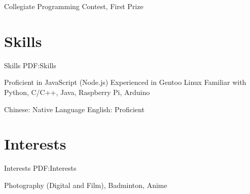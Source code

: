 \documentclass[a4paper,MMMyyyy,nonstop]{simpleresumecv}
\begin{document}
\begin{body}
\BulletItem
Collegiate Programming Contest, First Prize
\hfill
\textbf{  }


\section
{Skills}
{Skills}
{PDF:Skills}

\BulletItem
Proficient in JavaScript (Node.js)
\BulletItem
Experienced in Gentoo Linux
\BulletItem
Familiar with Python, C/C++, Java, Raspberry Pi, Arduino

\BulletItem
Chinese: Native Language
\BulletItem
English: Proficient


\section
{Interests}
{Interests}
{PDF:Interests}

Photography (Digital and Film), Badminton, Anime

\end{body}
\end{document}
